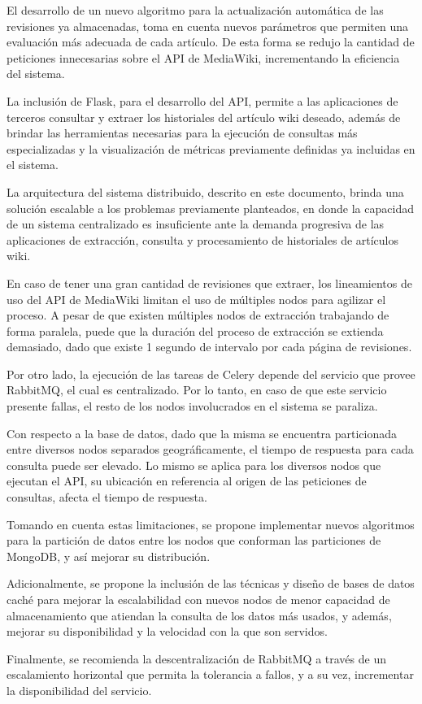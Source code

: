 El desarrollo de un nuevo algoritmo para la actualización automática de las revisiones ya almacenadas, toma en cuenta nuevos parámetros que permiten una evaluación más adecuada de cada artículo.
De esta forma se redujo la cantidad de peticiones innecesarias sobre el API de MediaWiki, incrementando la eficiencia del sistema.

La inclusión de Flask, para el desarrollo del API, permite a las aplicaciones de terceros consultar y extraer
los historiales del artículo wiki deseado, además de brindar las herramientas necesarias para la ejecución
de consultas más especializadas y la visualización de métricas previamente definidas ya incluidas en el sistema.

La arquitectura del sistema distribuido, descrito en este documento, brinda
una solución escalable a los problemas previamente planteados, en donde la capacidad
de un sistema centralizado es insuficiente ante la demanda progresiva de las aplicaciones de
extracción, consulta y procesamiento de historiales de artículos wiki.

En caso de tener una gran cantidad de revisiones que extraer, los lineamientos de uso del API de MediaWiki limitan el uso de múltiples nodos para agilizar el proceso.
A pesar de que existen múltiples nodos de extracción trabajando de forma paralela, puede que la duración del proceso de extracción se extienda demasiado, dado que existe 1 segundo de intervalo por cada página de revisiones.

Por otro lado, la ejecución de las tareas de Celery depende del servicio que provee RabbitMQ, el cual es centralizado.
Por lo tanto, en caso de que este servicio presente fallas, el resto de los nodos involucrados en el sistema se paraliza.

Con respecto a la base de datos, dado que la misma se encuentra particionada entre diversos nodos separados geográficamente, el tiempo de respuesta para cada consulta puede ser elevado.
Lo mismo se aplica para los diversos nodos que ejecutan el API, su ubicación en referencia al origen de las peticiones de consultas, afecta el tiempo de respuesta.

Tomando en cuenta estas limitaciones, se propone implementar nuevos algoritmos para la partición de datos entre los nodos que conforman las particiones de MongoDB, y así mejorar su distribución.

Adicionalmente, se propone la inclusión de las técnicas y diseño de bases de datos caché para mejorar la escalabilidad con nuevos nodos de menor capacidad de almacenamiento que atiendan la consulta de los datos más usados, y además, mejorar su disponibilidad y la velocidad con la que son servidos.

Finalmente, se recomienda la descentralización de RabbitMQ a través de un escalamiento horizontal que permita la tolerancia a fallos, y a su vez, incrementar la disponibilidad del servicio.
